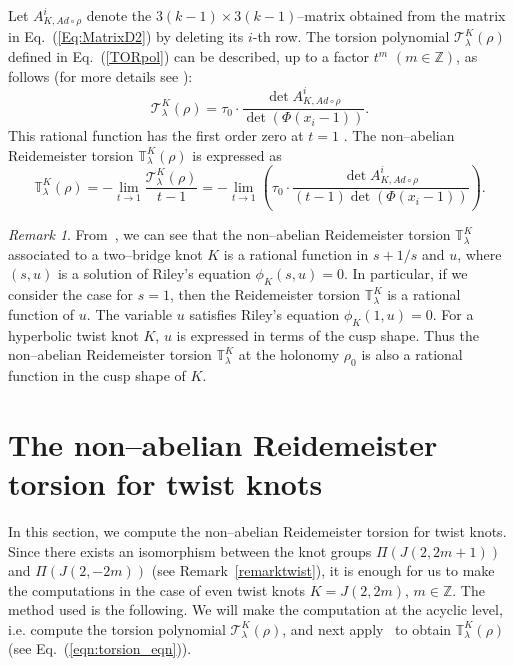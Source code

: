 \documentclass[a4paper]{amsart}
\theoremstyle{plain}
\theoremstyle{definition}
\theoremstyle{remark}
\newtheorem{remark}{Remark}%
\newcommand{\Z}{{\mathbb Z}}
\newcommand{\ZZ}{{\mathbb Z}}
\newcommand{\T}{\mathcal{T}}
\begin{document}
Let $A^i_{K, Ad\circ \rho}$ denote the $3(k-1)\times 3(k-1)$--matrix obtained from the matrix in Eq.~(\ref{Eq:MatrixD2}) by deleting its $i$-th row. The torsion polynomial $\T^K_{\lambda}(\rho)$ defined in Eq.~(\ref{TORpol}) can be described, up to a factor $t^m$ $(m\in \Z)$, as follows  (for more details see \cite{KL, Kitano}):
\begin{equation}\label{torsionK}
\T^K_{\lambda}(\rho) = \tau_0 \cdot
\frac{\det A^i_{K, Ad\circ \rho}}{\det(\Phi(x_i-1))}.
\end{equation}
This rational function has the first order zero at $t=1$ \cite[Theorem 3.1.2]{YY1}.
The non--abelian Reidemeister torsion ${\mathbb T}^K_{\lambda}(\rho)$
is expressed as 
\begin{equation}\label{eqn:torsion_eqn}
{\mathbb T}^K_{\lambda}(\rho)
= -\lim_{t \to 1}
\frac{\T^K_{\lambda}(\rho)}{t-1}
=
-\lim_{t \to 1}
\left(
\tau_0 \cdot
\frac{\det A^i_{K, Ad\circ \rho}}{(t-1)\det(\Phi(x_i-1))}
\right).
\end{equation}

\begin{remark}
From~\cite[Proposition 4.3.1]{YY1},
we can see that 
the non--abelian Reidemeister torsion ${\mathbb T}^K_{\lambda}$ associated to 
a two--bridge knot $K$ is a rational function in $s+1/s$ and $u$, where $(s, u)$ is a solution of Riley's equation $\phi_K(s,u) = 0$.
In particular, if we consider the case for $s=1$, then 
the Reidemeister torsion ${\mathbb T}^K_{\lambda}$ is a rational function of $u$.
The variable $u$ satisfies Riley's equation $\phi_K(1, u) = 0$.
For a hyperbolic twist knot $K$, $u$ is expressed in terms of the cusp shape.
Thus the non--abelian Reidemeister torsion ${\mathbb T}^K_{\lambda}$ at the holonomy $\rho_0$ is also a rational function 
in the cusp shape of $K$.
\end{remark}


\section{The non--abelian Reidemeister torsion for twist knots}
\label{section:results}
In this section, we compute the non--abelian Reidemeister torsion for twist knots. 
Since there exists an isomorphism between the knot groups $\Pi(J(2, 2m+1))$ and $\Pi(J(2, -2m))$ (see Remark~\ref{remarktwist}), it is enough for us to make the computations in the case of even twist knots $K = J(2, 2m)$, $m \in \ZZ$.
The method used is the following. We will make the computation at the acyclic level, i.e. compute the torsion polynomial $\T^K_{\lambda}(\rho)$, and next apply~\cite[Theorem 3.1.2]{YY1} to obtain $\mathbb{T}^K_\lambda(\rho)$ (see Eq.~(\ref{eqn:torsion_eqn})). 
\end{document}

